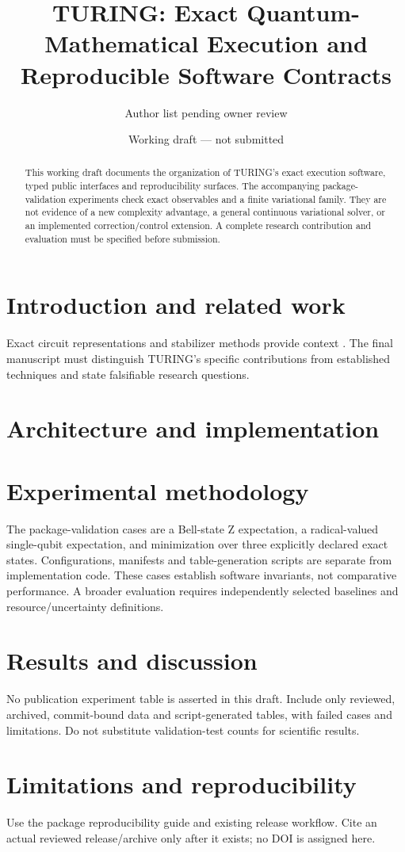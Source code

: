 \documentclass{article}
\title{TURING: Exact Quantum-Mathematical Execution and Reproducible Software Contracts}
\author{Author list pending owner review}
\date{Working draft --- not submitted}
\begin{document}
\maketitle
\begin{abstract}
This working draft documents the organization of TURING's exact execution
software, typed public interfaces and reproducibility surfaces. The accompanying
package-validation experiments check exact observables and a finite variational
family. They are not evidence of a new complexity advantage, a general continuous
variational solver, or an implemented correction/control extension. A complete
research contribution and evaluation must be specified before submission.
\end{abstract}
\section{Introduction and related work}
Exact circuit representations and stabilizer methods provide context
\cite{nielsen2010,aaronson2004}. The final manuscript must distinguish TURING's
specific contributions from established techniques and state falsifiable
research questions.
\section{Architecture and implementation}

\section{Experimental methodology}
The package-validation cases are a Bell-state Z expectation, a radical-valued
single-qubit expectation, and minimization over three explicitly declared exact
states. Configurations, manifests and table-generation scripts are separate from
implementation code. These cases establish software invariants, not comparative
performance. A broader evaluation requires independently selected baselines and
resource/uncertainty definitions.
\section{Results and discussion}
No publication experiment table is asserted in this draft. Include only reviewed,
archived, commit-bound data and script-generated tables, with failed cases and
limitations. Do not substitute validation-test counts for scientific results.
\section{Limitations and reproducibility}
Use the package reproducibility guide and existing release workflow. Cite an
actual reviewed release/archive only after it exists; no DOI is assigned here.


\end{document}
